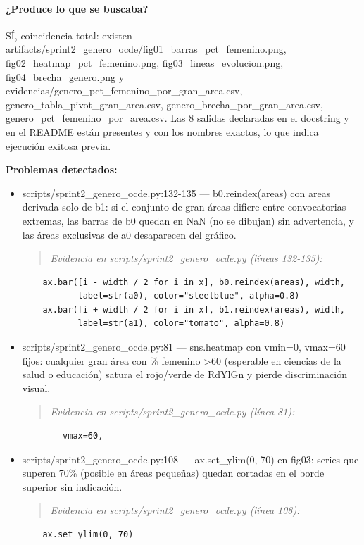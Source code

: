 \paragraph{¿Produce lo que se buscaba?}
SÍ, coincidencia total: existen artifacts/sprint2\_genero\_ocde/fig01\_barras\_pct\_femenino.png, fig02\_heatmap\_pct\_femenino.png, fig03\_lineas\_evolucion.png, fig04\_brecha\_genero.png y evidencias/genero\_pct\_femenino\_por\_gran\_area.csv, genero\_tabla\_pivot\_gran\_area.csv, genero\_brecha\_por\_gran\_area.csv, genero\_pct\_femenino\_por\_area.csv. Las 8 salidas declaradas en el docstring y en el README están presentes y con los nombres exactos, lo que indica ejecución exitosa previa.

\begin{tcolorbox}[riesgo]
\textbf{Problemas detectados:}
\begin{itemize}
  \item scripts/sprint2\_genero\_ocde.py:132-135 --- b0.reindex(areas) con areas derivada solo de b1: si el conjunto de gran áreas difiere entre convocatorias extremas, las barras de b0 quedan en NaN (no se dibujan) sin advertencia, y las áreas exclusivas de a0 desaparecen del gráfico.
\begin{quote}\footnotesize\ttfamily
\noindent\emph{Evidencia en scripts/sprint2\_genero\_ocde.py (líneas 132-135):}
\end{quote}
\begin{lstlisting}
    ax.bar([i - width / 2 for i in x], b0.reindex(areas), width,
           label=str(a0), color="steelblue", alpha=0.8)
    ax.bar([i + width / 2 for i in x], b1.reindex(areas), width,
           label=str(a1), color="tomato", alpha=0.8)
\end{lstlisting}

  \item scripts/sprint2\_genero\_ocde.py:81 --- sns.heatmap con vmin=0, vmax=60 fijos: cualquier gran área con \% femenino >60 (esperable en ciencias de la salud o educación) satura el rojo/verde de RdYlGn y pierde discriminación visual.
\begin{quote}\footnotesize\ttfamily
\noindent\emph{Evidencia en scripts/sprint2\_genero\_ocde.py (línea 81):}
\end{quote}
\begin{lstlisting}
        vmax=60,
\end{lstlisting}

  \item scripts/sprint2\_genero\_ocde.py:108 --- ax.set\_ylim(0, 70) en fig03: series que superen 70\% (posible en áreas pequeñas) quedan cortadas en el borde superior sin indicación.
\begin{quote}\footnotesize\ttfamily
\noindent\emph{Evidencia en scripts/sprint2\_genero\_ocde.py (línea 108):}
\end{quote}
\begin{lstlisting}
    ax.set_ylim(0, 70)
\end{lstlisting}

\end{itemize}
\end{tcolorbox}

